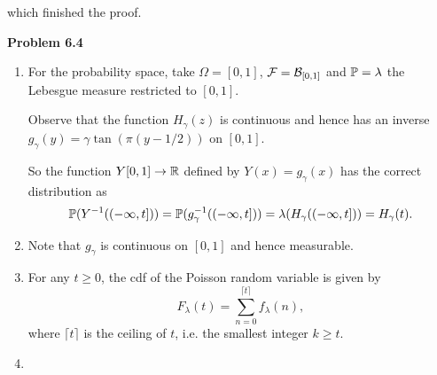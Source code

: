 which finished the proof.

\bigskip

\textbf{Problem 6.4} 

\begin{enumerate}[label=(\alph*)]
\item {}
For the probability space, take $\Omega = [0,1]$, $\mathcal F = \mathcal B_{[0,1]}$ and $\mathbb P = \lambda$ the Lebesgue measure restricted to $[0,1]$. 

Observe that the function $H_\gamma(z)$ is continuous and hence has an inverse $g_\gamma(y) = \gamma \tan(\pi(y - 1/2))$ on $[0,1]$.

So the function $Y [0,1] \to \mathbb R$ defined by $Y(x) = g_\gamma(x)$ has the correct distribution as
\[
	\mathbb P(Y^{-1}((-\infty,t])) = \mathbb P(g_\gamma^{-1}((-\infty, t])) = \lambda(H_\gamma((-\infty,t])) = H_\gamma(t).
\]
\item {} 
Note that $g_\gamma$ is continuous on $[0,1]$ and hence measurable.
\item {} 

For any $t \ge 0$, the cdf of the Poisson random variable is given by
\[
	F_\lambda(t) = \sum_{n = 0}^{\lceil t \rceil} f_\lambda(n),
\]
where $\lceil t \rceil$ is the ceiling of $t$, i.e. the smallest integer $k \ge t$.
\item {}
\end{enumerate}
